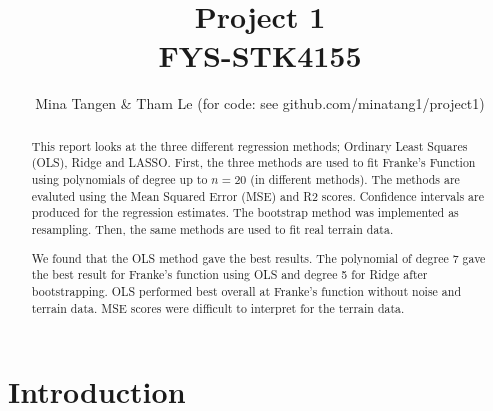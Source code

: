 \documentclass[a4paper]{article}
\title{\textbf{Project 1 \\ FYS-STK4155}}
\author{Mina Tangen \& Tham Le (for code: see github.com/minatang1/project1)}
\begin{document}
 

\begin{titlingpage}
\maketitle

\begin{abstract}

This report looks at the three different regression methods; Ordinary Least Squares (OLS), Ridge and LASSO. First, the three methods are used to fit Franke's Function using polynomials of degree up to $n = 20$ (in different methods). The methods are evaluted using the Mean Squared Error (MSE) and R2 scores. Confidence intervals are produced for the regression estimates. The bootstrap method was implemented as resampling. Then, the same methods are used to fit real terrain data.

We found that the OLS method gave the best results. The polynomial of degree 7 gave the best result for Franke's function using OLS and degree 5 for Ridge after bootstrapping. 
OLS performed best overall at Franke's function without noise and terrain data. MSE scores were difficult to interpret for the terrain data.

\end{abstract}

\end{titlingpage}

\section{Introduction}




\end{document}
